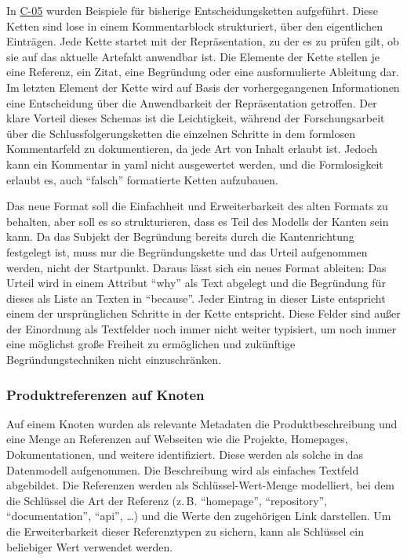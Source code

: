 In \hyperref[subsec:c-05-reason-not-good-enough]{C-05} wurden Beispiele für bisherige Entscheidungsketten aufgeführt.
Diese Ketten sind lose in einem Kommentarblock strukturiert, über den eigentlichen Einträgen.
Jede Kette startet mit der Repräsentation, zu der es zu prüfen gilt, ob sie auf das aktuelle Artefakt anwendbar ist.
Die Elemente der Kette stellen je eine Referenz, ein Zitat, eine Begründung oder eine ausformulierte Ableitung dar.
Im letzten Element der Kette wird auf Basis der vorhergegangenen Informationen eine Entscheidung über die Anwendbarkeit der Repräsentation getroffen.
Der klare Vorteil dieses Schemas ist die Leichtigkeit, während der Forschungsarbeit über die Schlussfolgerungsketten die einzelnen Schritte in dem formlosen Kommentarfeld zu dokumentieren, da jede Art von Inhalt erlaubt ist.
Jedoch kann ein Kommentar in \acrshort{yaml} nicht ausgewertet werden, und die Formlosigkeit erlaubt es, auch \enquote{falsch} formatierte Ketten aufzubauen.

Das neue Format soll die Einfachheit und Erweiterbarkeit des alten Formats zu behalten, aber soll es so strukturieren, dass es Teil des Modells der Kanten sein kann.
Da das Subjekt der Begründung bereits durch die Kantenrichtung festgelegt ist, muss nur die Begründungskette und das Urteil aufgenommen werden, nicht der Startpunkt.
Daraus lässt sich ein neues Format ableiten:
Das Urteil wird in einem Attribut \enquote{why} als Text abgelegt und die Begründung für dieses als Liste an Texten in \enquote{because}.
Jeder Eintrag in dieser Liste entspricht einem der ursprünglichen Schritte in der Kette entspricht.
Diese Felder sind außer der Einordnung als Textfelder noch immer nicht weiter typisiert, um noch immer eine möglichst große Freiheit zu ermöglichen und zukünftige Begründungstechniken nicht einzuschränken.

\subsubsection{Produktreferenzen auf Knoten}

Auf einem Knoten wurden als relevante Metadaten die Produktbeschreibung und eine Menge an Referenzen auf Webseiten wie die Projekte, Homepages, Dokumentationen, und weitere identifiziert.
Diese werden als solche in das Datenmodell aufgenommen.
Die Beschreibung wird als einfaches Textfeld abgebildet.
Die Referenzen werden als Schlüssel-Wert-Menge modelliert, bei dem die Schlüssel die Art der Referenz (z.\,B. \enquote{homepage}, \enquote{repository}, \enquote{documentation}, \enquote{api}, \ldots) und die Werte den zugehörigen Link darstellen.
Um die Erweiterbarkeit dieser Referenztypen zu sichern, kann als Schlüssel ein beliebiger Wert verwendet werden.

